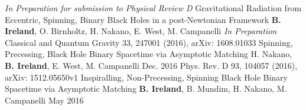 \begin{cventries}
   \cventry
    {\textit{In Preparation for submission to Physical Review D}}
    {Gravitational Radiation from Eccentric, Spinning, Binary Black Holes in a post-Newtonian Framework}
    {\textbf{B. Ireland}, O. Birnholtz, H. Nakano, E. West, M. Campanelli}
    {\textit{In Preparation}}
    {
     } 
  \cventry
    {Classical and Quantum Gravity 33, 247001 (2016), arXiv: 1608.01033}
    {Spinning, Precessing, Black Hole Binary Spacetime via Asymptotic Matching}
    {H. Nakano, \textbf{B. Ireland}, E. West, M. Campanelli}
    {Dec. 2016}
    {
     }
  \cventry
    {Phys. Rev. D 93, 104057 (2016), arXiv: 1512.05650v1}
    {Inspiralling, Non-Precessing, Spinning Black Hole Binary Spacetime via Asymptotic Matching}
    {\textbf{B. Ireland}, B. Mundim, H. Nakano, M. Campanelli}
    {May 2016}
    {
    }
\end{cventries}
